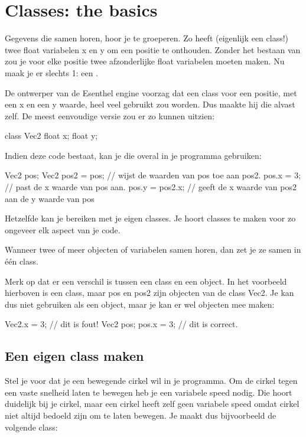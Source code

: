 \chapter{Classes: the basics}

Gegevens die samen horen, hoor je te groeperen. Zo heeft  (eigenlijk een class!) twee float variabelen x en y om een positie te onthouden. Zonder het bestaan van  zou je voor elke positie twee afzonderlijke float variabelen moeten maken. Nu maak je er slechts 1: een .

De ontwerper van de Esenthel engine voorzag dat een class voor een positie, met een x en een y waarde, heel veel gebruikt zou worden. Dus maakte hij die alvast zelf. De meest eenvoudige versie zou er zo kunnen uitzien:

\begin{code}
class Vec2 {
	float x;
	float y;
}  
\end{code}

Indien deze code bestaat, kan je die overal in je programma gebruiken:

\begin{code}
Vec2 pos;
Vec2 pos2 = pos; // wijst de waarden van pos toe aan pos2.
pos.x = 3;       // past de x waarde van pos aan.
pos.y = pos2.x;  // geeft de x waarde van pos2 aan de y waarde van pos
\end{code}

Hetzelfde kan je bereiken met je eigen classes. Je hoort classes te maken voor zo ongeveer elk aspect van je code. 

\begin{note}
Wanneer twee of meer objecten of variabelen samen horen, dan zet je ze samen in één class.
\end{note}

Merk op dat er een verschil is tussen een class en een object. In het voorbeeld hierboven is  een class, maar pos en pos2 zijn objecten van de class Vec2. Je kan  dus niet gebruiken als een object, maar je kan er wel objecten mee maken:

\begin{code}
Vec2.x = 3; // dit is fout!
Vec2 pos;
pos.x = 3; // dit is correct.
\end{code}

\section{Een eigen class maken}
Stel je voor dat je een bewegende cirkel wil in je programma. Om de cirkel tegen een vaste snelheid laten te bewegen heb je een variabele speed nodig. Die hoort duidelijk bij je cirkel, maar een cirkel heeft zelf geen variabele speed omdat cirkel niet altijd bedoeld zijn om te laten bewegen. Je maakt dus bijvoorbeeld de volgende class:

